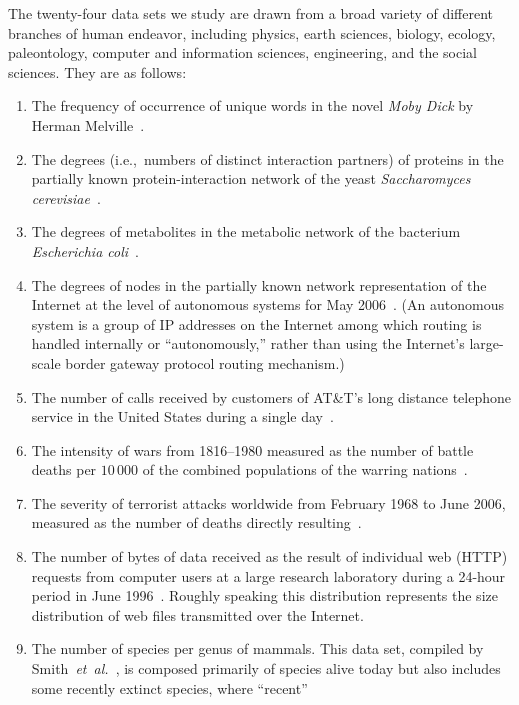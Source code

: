 \documentclass[final]{siamltex}
\newcommand{\etal}{\textit{et~al.}}
\begin{document}
The twenty-four data sets we study are drawn from a broad variety of
different branches of human endeavor, including physics, earth sciences,
biology, ecology, paleontology, computer and information sciences,
engineering, and the social sciences.  They are as follows:
\begin{enumerate}
 \renewcommand{\theenumi}{\alph{enumi}}
 \renewcommand{\labelenumi}{\theenumi)}
\setlength{\itemsep}{0pt}
\item The frequency of occurrence of unique words in the novel \textit{Moby
   Dick} by Herman Melville~\cite{MEJN-on-power-laws}.
\item The degrees (i.e.,~numbers of distinct interaction partners) of
 proteins in the partially known protein-interaction network of the yeast
 \textit{Saccharomyces cerevisiae}~\cite{Ito00}.
\item The degrees of metabolites in the metabolic network of the bacterium
 \textit{Escherichia coli}~\cite{Holme06a}.
\item The degrees of nodes in the partially known network representation of
 the Internet at the level of autonomous systems for May
 2006~\cite{Holme06b}.  (An autonomous system is a group of IP addresses
 on the Internet among which routing is handled internally or
 ``autonomously,'' rather than using the Internet's large-scale border gateway protocol
 routing mechanism.)
\item The number of calls received by customers of AT\&T's long distance
 telephone service in the United States during a single day~\cite{ABW98,ACL00}.
\item The intensity of wars from 1816--1980 measured as the number of
 battle deaths per $10\,000$ of the combined populations of the warring
 nations~\cite{SS82,RT98}.
\item The severity of terrorist attacks worldwide from February 1968 to
 June 2006, measured as the number of deaths directly
 resulting~\cite{Clauset07}.
\item The number of bytes of data received as the result of individual web
 (HTTP) requests from computer users at a large research laboratory during
 a 24-hour period in June 1996~\cite{Willinger98}.  Roughly speaking this
 distribution represents the size distribution of web files transmitted
 over the Internet.
\item The number of species per genus of mammals.  This data set, compiled
 by Smith~\etal~\cite{Smith03}, is composed primarily of species alive
 today but also includes some recently extinct species, where ``recent''

\end{enumerate}
\end{document}
